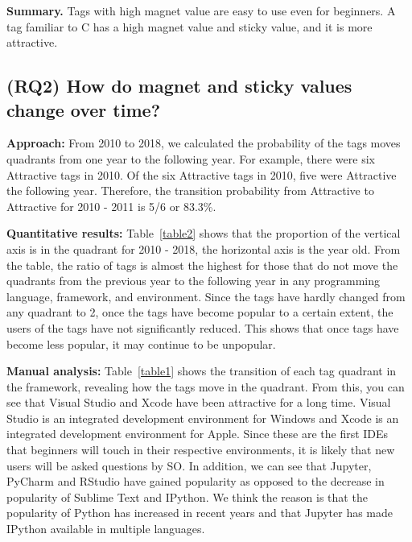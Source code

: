 \documentclass[conference]{IEEEtran}
\begin{document}
\noindent \textbf{Summary.}
 Tags with high magnet value are easy to use even for beginners. A tag familiar to C has a high magnet value and sticky value, and it is more attractive.


\subsection{(RQ2) How do magnet and sticky values change over time?} 

\noindent \textbf{Approach:}
From 2010 to 2018, we calculated the probability of the tags moves quadrants from one year to the following year. For example, there were six Attractive tags in 2010. Of the six Attractive tags in 2010, five were Attractive the following year. Therefore, the transition probability from Attractive to Attractive for 2010 - 2011 is 5/6 or 83.3\%. 

\noindent \textbf{Quantitative results:}
Table~\ref{table2} shows that the proportion of the vertical axis is in the quadrant for 2010 - 2018, the horizontal axis is the year old. From the table, the ratio of tags is almost the highest for those that do not move the quadrants from the previous year to the following year in any programm{}ing language, framework, and environment. Since the tags have hardly changed from any quadrant to 2, once the tags have become popular to a certain extent, the users of the tags have not significantly reduced. This shows that once tags have become less popular, it may continue to be unpopular.

\noindent \textbf{Manual analysis:}
Table~\ref{table1} shows the transition of each tag quadrant in the framework, revealing how the tags move in the quadrant. From this, you can see that Visual Studio\cite{johnson2012professional} and Xcode\cite{tisato1984xcode} have been attractive for a long time. Visual Studio is an integrated development environment for Windows and Xcode is an integrated development environment for Apple. Since these are the first IDEs that beginners will touch in their respective environments, it is likely that new users will be asked questions by SO. In addition, we can see that Jupyter\cite{perkel2018jupyter}, PyCharm\cite{islam2015mastering} and RStudio\cite{allaire2012rstudio} have gained popularity as opposed to the decrease in popularity of Sublime Text\cite{peleg2013mastering} and IPython\cite{perez2007ipython}. We think the reason is that the popularity of Python has increased in recent years and that Jupyter has made IPython available in multiple languages.
\end{document}
